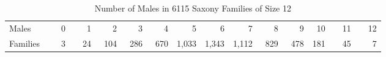 \begin{table}[htb]
 \caption{Number of Males in 6115 Saxony Families of Size 12}\label{tab:saxdata}
 \begin{center}
 \begin{tabular}{l|rrrrrrrrrrrrr}
  \hline
  Males & 0 & 1 & 2 & 3 & 4 & 5 & 6 & 7 & 8 & 9 & 10 & 11 & 12 \\ 
  Families & ~~~3 & ~~24 & ~104 & ~286 & ~670 & 1,033 & 1,343 & 1,112 & ~829 & ~478 & 181 & ~~45 & ~~~7 \\ 
  \hline
 \end{tabular}
 \end{center}
\end{table}
